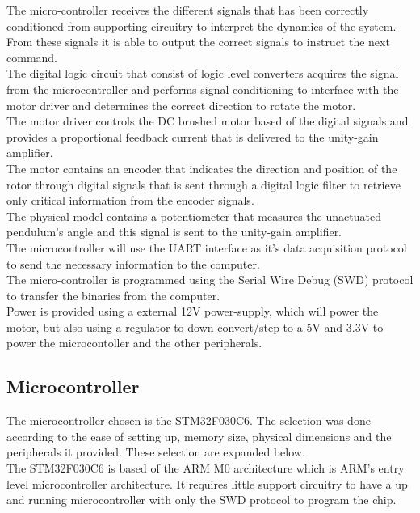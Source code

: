 The micro-controller receives the different signals that has been correctly conditioned from supporting circuitry to interpret the dynamics of the system. From these signals it is able to output the correct signals to instruct the next command.\\

The digital logic circuit that consist of logic level converters acquires the signal from the microcontroller and performs signal conditioning to interface with the motor driver and determines the correct direction to rotate the motor. \\

The motor driver controls the DC brushed motor based of the digital signals and provides a proportional feedback current that is delivered to the unity-gain amplifier.\\

The motor contains an encoder that indicates the direction and position of the rotor through digital signals that is sent through a digital logic filter to retrieve only critical information from the encoder signals. \\

The physical model contains a potentiometer that measures the unactuated pendulum's angle and this signal is sent to the unity-gain amplifier.\\

The microcontroller will use the UART interface as it's data acquisition protocol to send the necessary information to the computer. \\

The micro-controller is programmed using the Serial Wire Debug (SWD) protocol to transfer the binaries from the computer.\\

Power is provided using a external 12V power-supply, which will power the motor, but also using a regulator to down convert/step to a 5V and 3.3V to power the microcontoller and the other peripherals.


\subsection{Microcontroller}
The microcontroller chosen is the STM32F030C6. The selection was done according to the ease of setting up, memory size, physical dimensions and the peripherals it provided. These selection are expanded below.\\

The STM32F030C6 is based of the ARM M0 architecture which is ARM's entry level microcontroller architecture. It requires little support circuitry to have a up and running microcontroller with only the SWD protocol to program the chip.\\

